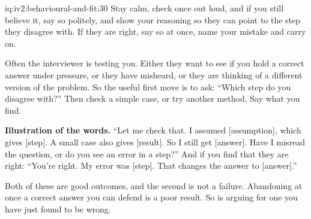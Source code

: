 \begin{solution}{iq:iv2:behavioural-and-fit:30}
Stay calm, check once out loud, and if you still believe it, say so politely, and show your reasoning so they can point to the step they disagree with. If they are right, say so at once, name your mistake and carry on.

Often the interviewer is testing you. Either they want to see if you hold a correct answer under pressure, or they have misheard, or they are thinking of a different version of the problem. So the useful first move is to ask: ``Which step do you disagree with?'' Then check a simple case, or try another method. Say what you find.

\textbf{Illustration of the words.} ``Let me check that. I assumed [assumption], which gives [step]. A small case also gives [result]. So I still get [answer]. Have I misread the question, or do you see an error in a step?'' And if you find that they are right: ``You're right. My error was [step]. That changes the answer to [answer].''

Both of these are good outcomes, and the second is not a failure. Abandoning at once a correct answer you can defend is a poor result. So is arguing for one you have just found to be wrong.

\end{solution}
